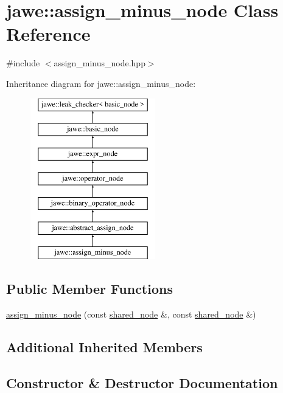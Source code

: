 \hypertarget{classjawe_1_1assign__minus__node}{}\section{jawe\+:\+:assign\+\_\+minus\+\_\+node Class Reference}
\label{classjawe_1_1assign__minus__node}


{\ttfamily \#include $<$assign\+\_\+minus\+\_\+node.\+hpp$>$}

Inheritance diagram for jawe\+:\+:assign\+\_\+minus\+\_\+node\+:\begin{figure}[H]
\begin{center}
\leavevmode
\includegraphics[height=7.000000cm]{classjawe_1_1assign__minus__node}
\end{center}
\end{figure}
\subsection*{Public Member Functions}
\begin{DoxyCompactItemize}
\item 
\hyperlink{classjawe_1_1assign__minus__node_a2af30fa677466e813e6816d26bad5706}{assign\+\_\+minus\+\_\+node} (const \hyperlink{namespacejawe_a3f307481d921b6cbb50cc8511fc2b544}{shared\+\_\+node} \&, const \hyperlink{namespacejawe_a3f307481d921b6cbb50cc8511fc2b544}{shared\+\_\+node} \&)
\end{DoxyCompactItemize}
\subsection*{Additional Inherited Members}


\subsection{Constructor \& Destructor Documentation}
\mbox{\label{classjawe_1_1assign__minus__node_a2af30fa677466e813e6816d26bad5706}} 
